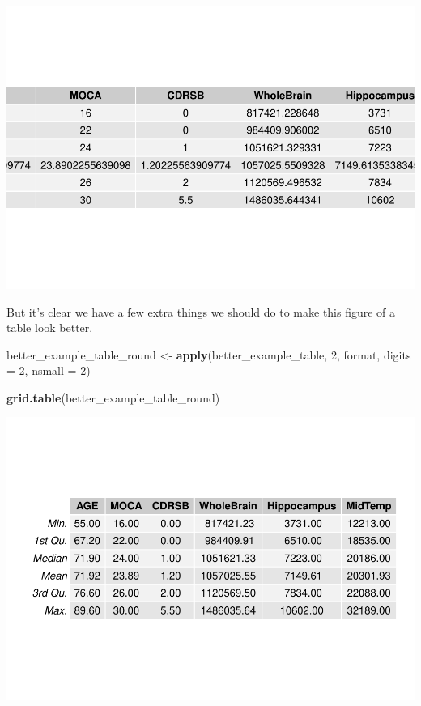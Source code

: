 \documentclass[]{article}
\newenvironment{Shaded}{\begin{snugshade}}{\end{snugshade}}
\newcommand{\DataTypeTok}[1]{\textcolor[rgb]{0.13,0.29,0.53}{#1}}
\newcommand{\DecValTok}[1]{\textcolor[rgb]{0.00,0.00,0.81}{#1}}
\newcommand{\KeywordTok}[1]{\textcolor[rgb]{0.13,0.29,0.53}{\textbf{#1}}}
\newcommand{\NormalTok}[1]{#1}
\newcommand{\StringTok}[1]{\textcolor[rgb]{0.31,0.60,0.02}{#1}}
\begin{document}
\includegraphics{1_b_Simple_RMarkdown_PDF_files/figure-latex/grid_and_gridExtra-1.pdf}

But it's clear we have a few extra things we should do to make this
figure of a table look better.

\begin{Shaded}
\begin{Highlighting}[]
\NormalTok{better_example_table_round <-}\StringTok{ }\KeywordTok{apply}\NormalTok{(better_example_table, }\DecValTok{2}\NormalTok{, }
\NormalTok{    format, }\DataTypeTok{digits =} \DecValTok{2}\NormalTok{, }\DataTypeTok{nsmall =} \DecValTok{2}\NormalTok{)}

\KeywordTok{grid.table}\NormalTok{(better_example_table_round)}
\end{Highlighting}
\end{Shaded}

\includegraphics{1_b_Simple_RMarkdown_PDF_files/figure-latex/grid_and_gridExtra_round-1.pdf}
\end{document}
